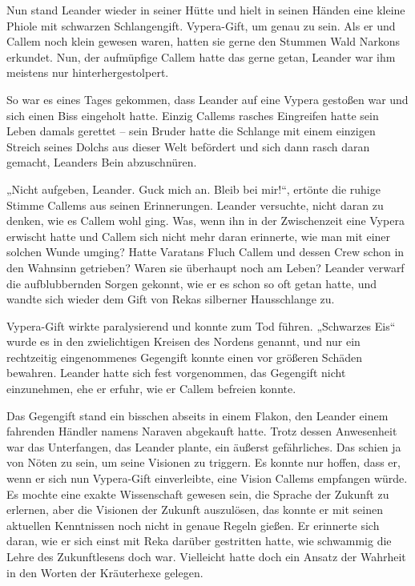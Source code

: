 Nun stand Leander wieder in seiner Hütte und hielt in seinen Händen eine kleine Phiole mit schwarzen Schlangengift. Vypera-Gift, um genau zu sein. Als er und Callem noch klein gewesen waren, hatten sie gerne den Stummen Wald Narkons erkundet. Nun, der aufmüpfige Callem hatte das gerne getan, Leander war ihm meistens nur hinterhergestolpert.

So war es eines Tages gekommen, dass Leander auf eine Vypera gestoßen war und sich einen Biss eingeholt hatte. Einzig Callems rasches Eingreifen hatte sein Leben damals gerettet – sein Bruder hatte die Schlange mit einem einzigen Streich seines Dolchs aus dieser Welt befördert und sich dann rasch daran gemacht, Leanders Bein abzuschnüren.

„Nicht aufgeben, Leander. Guck mich an. Bleib bei mir!“, ertönte die ruhige Stimme Callems aus seinen Erinnerungen. Leander versuchte, nicht daran zu denken, wie es Callem wohl ging. Was, wenn ihn in der Zwischenzeit eine Vypera erwischt hatte und Callem sich nicht mehr daran erinnerte, wie man mit einer solchen Wunde umging? Hatte Varatans Fluch Callem und dessen Crew schon in den Wahnsinn getrieben? Waren sie überhaupt noch am Leben? Leander verwarf die aufblubbernden Sorgen gekonnt, wie er es schon so oft getan hatte, und wandte sich wieder dem Gift von Rekas silberner Hausschlange zu.

Vypera-Gift wirkte paralysierend und konnte zum Tod führen. „Schwarzes Eis“ wurde es in den zwielichtigen Kreisen des Nordens genannt, und nur ein rechtzeitig eingenommenes Gegengift konnte einen vor größeren Schäden bewahren. Leander hatte sich fest vorgenommen, das Gegengift nicht einzunehmen, ehe er erfuhr, wie er Callem befreien konnte.

Das Gegengift stand ein bisschen abseits in einem Flakon, den Leander einem fahrenden Händler namens Naraven abgekauft hatte. Trotz dessen Anwesenheit war das Unterfangen, das Leander plante, ein äußerst gefährliches. Das schien ja von Nöten zu sein, um seine Visionen zu triggern. Es konnte nur hoffen, dass er, wenn er sich nun Vypera-Gift einverleibte, eine Vision Callems empfangen würde. Es mochte eine exakte Wissenschaft gewesen sein, die Sprache der Zukunft zu erlernen, aber die Visionen der Zukunft auszulösen, das konnte er mit seinen aktuellen Kenntnissen noch nicht in genaue Regeln gießen. Er erinnerte sich daran, wie er sich einst mit Reka darüber gestritten hatte, wie schwammig die Lehre des Zukunftlesens doch war. Vielleicht hatte doch ein Ansatz der Wahrheit in den Worten der Kräuterhexe gelegen.

